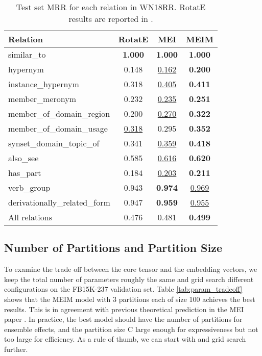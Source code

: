\documentclass{article}
\theoremstyle{plain}
\theoremstyle{remark}
\begin{document}
\begin{table}[ht]
	\caption[]{Test set MRR for each relation in WN18RR. RotatE results are reported in \cite{zhang_quaternionknowledgegraph_2019}.}
	\label{tab:result_detailrelation}
	\centering  
	\begin{adjustbox}{max width=\linewidth}
		\begin{tabular}{@{\extracolsep{2pt}}lcc|c}


			Relation & RotatE & MEI & MEIM \\
			\midrule
			
			similar\_to & \textbf{1.000} & \textbf{1.000} & \textbf{1.000} \\ hypernym & 0.148 & \underline{0.162} & \textbf{0.200} \\ instance\_hypernym & 0.318 & \underline{0.405} & \textbf{0.411} \\ member\_meronym & 0.232 & \underline{0.235} & \textbf{0.251} \\ member\_of\_domain\_region & 0.200 & \underline{0.270} & \textbf{0.322} \\ member\_of\_domain\_usage & \underline{0.318} & 0.295 & \textbf{0.352} \\ synset\_domain\_topic\_of & 0.341 & \underline{0.359} & \textbf{0.418} \\ also\_see & 0.585 & \underline{0.616} & \textbf{0.620} \\ has\_part & 0.184 & \underline{0.203} & \textbf{0.211} \\ verb\_group & 0.943 & \textbf{0.974} & \underline{0.969} \\ derivationally\_related\_form & 0.947 & \textbf{0.959} & \underline{0.955} \\ 

			\midrule
			
			All relations & 0.476 & 0.481 & \textbf{0.499} \\
			
\end{tabular}
	\end{adjustbox}
\end{table}

\subsection{Number of Partitions and Partition Size}
To examine the trade off between the core tensor and the embedding vectors, we keep the total number of parameters roughly the same and grid search different configurations on the FB15K-237 validation set. Table \ref{tab:param_tradeoff} shows that the MEIM model with 3 partitions each of size 100 achieves the best results. This is in agreement with previous theoretical prediction in the MEI paper \cite{tran_multipartitionembeddinginteraction_2020}. In practice, the best model should have the number of partitions  for ensemble effects, and the partition size C large enough for expressiveness but not too large for efficiency. As a rule of thumb, we can start with  and grid search further.
\end{document}
